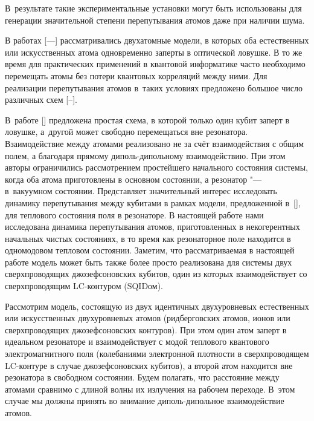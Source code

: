 В~результате такие экспериментальные установки могут быть использованы для генерации значительной степени перепутывания атомов даже при наличии шума.



В работах [----]  рассматривались двухатомные модели, в которых оба естественных или искусственных атома одновременно заперты в оптической ловушке. В то же время  для практических применений в квантовой информатике часто необходимо перемещать атомы без потери квантовых корреляций между ними. Для реализации перепутывания атомов в~таких условиях предложено большое число различных схем [--]. 

В~работе [] предложена простая схема, в которой  только один кубит заперт в  ловушке, а~другой  может свободно перемещаться вне резонатора. Взаимодействие между атомами реализовано не за счёт взаимодействия с общим полем, а благодаря прямому диполь-дипольному взаимодействию. При этом авторы ограничились рассмотрением простейшего начального состояния системы, когда оба атома приготовлены в основном состоянии, а резонатор "--- в~вакуумном состоянии. Представляет значительный интерес исследовать динамику перепутывания между кубитами в рамках модели, предложенной в~[], для теплового состояния поля в резонаторе. В настоящей работе нами исследована динамика перепутывания  атомов, приготовленных в некогерентных начальных чистых состояниях, в то время как резонаторное поле находится в одномодовом тепловом состоянии. Заметим, что рассматриваемая в настоящей работе модель  может быть также более просто реализована для системы двух сверхпроводящих джозефсоновских кубитов, один из которых взаимодействует со сверхпроводящим LC-контуром (SQIDом).





Рассмотрим модель, состоящую из двух идентичных двухуровневых естественных или искусственных двухуровневых атомов (ридберговских атомов, ионов или сверхпроводящих джозефсоновских контуров). При этом один атом заперт в идеальном резонаторе  и взаимодействует с модой теплового квантового электромагнитного поля (колебаниями электронной плотности в сверхпроводящем LC-контуре в случае джозефсоновских кубитов), а второй атом находится вне резонатора в свободном состоянии.  Будем полагать, что расстояние между атомами сравнимо с длиной волны их излучения на рабочем переходе. В~этом случае мы должны принять во внимание диполь-дипольное взаимодействие атомов. 

